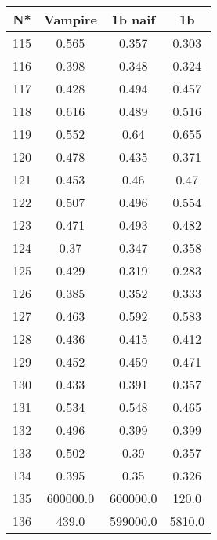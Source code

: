 \begin{table}[H]
\begin{tabular}{|c|c|c|c|}
\hline
N* & Vampire & 1b naif & 1b \\
\hline
115 & 0.565 & 0.357 & 0.303 \\
\hline
116 & 0.398 & 0.348 & 0.324 \\
\hline
117 & 0.428 & 0.494 & 0.457 \\
\hline
118 & 0.616 & 0.489 & 0.516 \\
\hline
119 & 0.552 & 0.64 & 0.655 \\
\hline
120 & 0.478 & 0.435 & 0.371 \\
\hline
121 & 0.453 & 0.46 & 0.47 \\
\hline
122 & 0.507 & 0.496 & 0.554 \\
\hline
123 & 0.471 & 0.493 & 0.482 \\
\hline
124 & 0.37 & 0.347 & 0.358 \\
\hline
125 & 0.429 & 0.319 & 0.283 \\
\hline
126 & 0.385 & 0.352 & 0.333 \\
\hline
127 & 0.463 & 0.592 & 0.583 \\
\hline
128 & 0.436 & 0.415 & 0.412 \\
\hline
129 & 0.452 & 0.459 & 0.471 \\
\hline
130 & 0.433 & 0.391 & 0.357 \\
\hline
131 & 0.534 & 0.548 & 0.465 \\
\hline
132 & 0.496 & 0.399 & 0.399 \\
\hline
133 & 0.502 & 0.39 & 0.357 \\
\hline
134 & 0.395 & 0.35 & 0.326 \\
\hline
135 & 600000.0 & 600000.0 & 120.0 \\
\hline
136 & 439.0 & 599000.0 & 5810.0 \\
\hline
\end{tabular}
\end{table}
